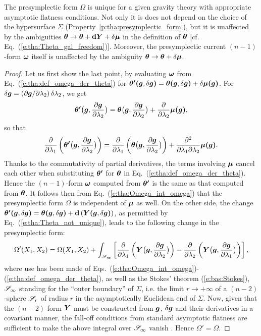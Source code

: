 \begin{prop}
\label{p:tha:uniqueness_presympl}
The presymplectic form $\Omega$ is unique for a given gravity theory with
appropriate asymptotic flatness conditions. Not only it is
does not depend on the choice of the
hypersurface $\Sigma$ (Property~\ref{p:tha:presymplectic_form}),
but it is unaffected by the ambiguities
$\bm{\theta} \to \bm{\theta} + \mathbf{d} \bm{Y} + \delta\bm{\mu}$
in the definition of $\bm{\theta}$ [cf. Eq.~(\ref{e:tha:Theta_gal_freedom})].
Moreover, the presymplectic current $(n-1)$-form $\bm{\omega}$ itself is unaffected
by the ambiguity
$\bm{\theta} \to \bm{\theta} + \delta\bm{\mu}$.
\end{prop}

\begin{proof}
Let us first show the last point, by evaluating $\bm{\omega}$
from Eq.~(\ref{e:tha:def_omega_der_theta})
for $\bm{\theta'}\textbf{(}\bm{g},\delta\bm{g}\textbf{)} = \bm{\theta}\textbf{(}\bm{g},\delta\bm{g}\textbf{)}
+ \delta \bm{\mu}\textbf{(}\bm{g}\textbf{)}$.
For $\delta\bm{g} = ({\partial \bm{g}}/{\partial \lambda_2}) \, \delta \lambda_2$, we get
\[
\bm{\theta'}\bm{\big(}\bm{g}, \frac{\partial \bm{g}}{\partial \lambda_2} \bm{\big)} = \bm{\theta}\bm{\big(}\bm{g}, \frac{\partial \bm{g}}{\partial \lambda_2} \bm{\big)} + \frac{\partial }{\partial \lambda_2} \bm{\mu}\textbf{(}\bm{g}\textbf{)} ,
\]
so that
\[
  \frac{\partial }{\partial \lambda_1}
        \left( \bm{\theta'}\bm{\big(}\bm{g}, \frac{\partial \bm{g}}{\partial \lambda_2} \bm{\big)}\right)
    = \frac{\partial }{\partial \lambda_1}
        \left( \bm{\theta}\bm{\big(}\bm{g}, \frac{\partial \bm{g}}{\partial \lambda_2} \bm{\big)}\right)
        + \frac{\partial^2}{\partial\lambda_1\partial\lambda_2} \bm{\mu}\textbf{(}\bm{g}\textbf{)}
 .
\]
Thanks to the commutativity of partial derivatives, the terms
involving $\bm{\mu}$ cancel each other when substituting $\bm{\theta'}$
for $\bm{\theta}$ in Eq.~(\ref{e:tha:def_omega_der_theta}).
Hence the $(n-1)$-form $\bm{\omega}$ computed from $\bm{\theta'}$
is the same as that computed from $\bm{\theta}$.
It follows then from Eq.~(\ref{e:tha:Omega_int_omega}) that
the presymplectic form $\Omega$ is independent of $\bm{\mu}$ as well.
On the other side,
the change  $\bm{\theta'}\textbf{(}\bm{g},\delta\bm{g}\textbf{)} = \bm{\theta}\textbf{(}\bm{g},\delta\bm{g}\textbf{)}
+ \mathbf{d} \left(\bm{Y}\textbf{(}\bm{g},\delta\bm{g}\textbf{)} \right)$, as permitted by Eq.~(\ref{e:tha:Theta_not_unique}),
leads to the following change in the presymplectic form:
\[
    \Omega'(X_1, X_2) = \Omega(X_1, X_2) + \int_{\mathscr{S}_\infty}
    \left[ \frac{\partial }{\partial \lambda_1}
        \left( \bm{Y}\bm{\big(}\bm{g}, \frac{\partial \bm{g}}{\partial \lambda_2} \bm{\big)}\right)
        - \frac{\partial }{\partial \lambda_2}\left( \bm{Y}\bm{\big(}\bm{g}, \frac{\partial \bm{g}}{\partial \lambda_1} \bm{\big)} \right) \right] ,
\]
where use has been made of Eqs.~(\ref{e:tha:Omega_int_omega})-(\ref{e:tha:def_omega_der_theta}),
as well as the Stokes' theorem (\ref{e:bas:Stokes}),
$\mathscr{S}_\infty$ standing for the ``outer boundary'' of $\Sigma$, i.e. the limit
$r\to +\infty$ of a $(n-2)$-sphere $\mathscr{S}_r$ of radius $r$ in the asymptotically Euclidean end
of $\Sigma$. Now, given that the $(n-2)$ form $\bm{Y}$ must be constructed from
$\bm{g}$, $\delta\bm{g}$ and their derivatives in a covariant manner, the fall-off
conditions from standard asymptotic flatness are sufficient to make
the above integral over $\mathscr{S}_\infty$ vanish \cite{IyerW94}. Hence $\Omega' = \Omega$.
\end{proof}


